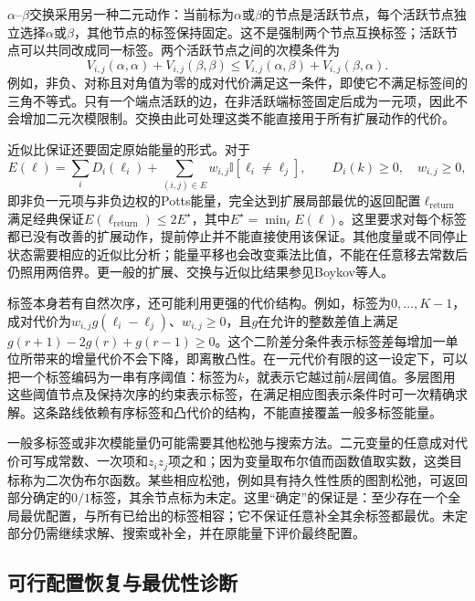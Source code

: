 $\alpha$--$\beta$交换采用另一种二元动作：当前标为$\alpha$或$\beta$的节点是活跃节点，每个活跃节点独立选择$\alpha$或$\beta$，其他节点的标签保持固定。这不是强制两个节点互换标签；活跃节点可以共同改成同一标签。两个活跃节点之间的次模条件为
\[
  V_{i,j}(\alpha,\alpha)+V_{i,j}(\beta,\beta)
    \leq V_{i,j}(\alpha,\beta)+V_{i,j}(\beta,\alpha).
\]
例如，非负、对称且对角值为零的成对代价满足这一条件，即使它不满足标签间的三角不等式。只有一个端点活跃的边，在非活跃端标签固定后成为一元项，因此不会增加二元次模限制。交换由此可处理这类不能直接用于所有扩展动作的代价。

近似比保证还要固定原始能量的形式。对于
\[
  E(\bm\ell)=\sum_iD_i(\ell_i)
       +\sum_{(i,j)\in E}w_{i,j}\mathbb I[\ell_i\ne\ell_j],
  \qquad D_i(k)\geq0,\quad w_{i,j}\geq0,
\]
即非负一元项与非负边权的Potts能量，完全达到扩展局部最优的返回配置$\bm\ell_{\mathrm{return}}$满足经典保证$E(\bm\ell_{\mathrm{return}})\leq2E^\star$，其中$E^\star=\min_{\bm\ell}E(\bm\ell)$。这里要求对每个标签都已没有改善的扩展动作，提前停止并不能直接使用该保证。其他度量或不同停止状态需要相应的近似比分析；能量平移也会改变乘法比值，不能在任意移去常数后仍照用两倍界。更一般的扩展、交换与近似比结果参见Boykov等人。

标签本身若有自然次序，还可能利用更强的代价结构。例如，标签为$0,\ldots,K-1$，成对代价为$w_{i,j}g(\ell_i-\ell_j)$、$w_{i,j}\geq0$，且$g$在允许的整数差值上满足$g(r+1)-2g(r)+g(r-1)\geq0$。这个二阶差分条件表示标签差每增加一单位所带来的增量代价不会下降，即离散凸性。在一元代价有限的这一设定下，可以把一个标签编码为一串有序阈值：标签为$k$，就表示它越过前$k$层阈值。多层图用这些阈值节点及保持次序的约束表示标签，在满足相应图表示条件时可一次精确求解。这条路线依赖有序标签和凸代价的结构，不能直接覆盖一般多标签能量。

一般多标签或非次模能量仍可能需要其他松弛与搜索方法。二元变量的任意成对代价可写成常数、一次项和$z_iz_j$项之和；因为变量取布尔值而函数值取实数，这类目标称为二次伪布尔函数。某些相应松弛，例如具有持久性性质的图割松弛，可返回部分确定的$0/1$标签，其余节点标为未定。这里“确定”的保证是：至少存在一个全局最优配置，与所有已给出的标签相容；它不保证任意补全其余标签都最优。未定部分仍需继续求解、搜索或补全，并在原能量下评价最终配置。

\subsection{可行配置恢复与最优性诊断}

\label{sec:pgm-variational-tightness-rounding}

